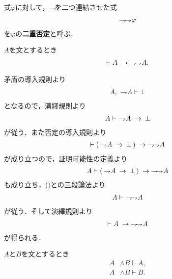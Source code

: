	式$\varphi$に対して，$\rightharpoondown\hspace{-0.25em}$を二つ連結させた式
	\begin{align}
		\rightharpoondown\hspace{-0.25em} \rightharpoondown\hspace{-0.25em} \varphi
	\end{align}
	を$\varphi$の{\bf 二重否定}と呼ぶ．
	
	\begin{screen}
		\begin{logicalthm}[二重否定の導入]
		\label{logicalthm:introduction_of_double_negation}
			$A$を文とするとき
			\begin{align}
				\vdash A \hspace{0.25em}\rightarrow\hspace{0.25em} \rightharpoondown\hspace{-0.25em} \rightharpoondown\hspace{-0.25em} A.
			\end{align}
		\end{logicalthm}
	\end{screen}
	
	\begin{prf}
		矛盾の導入規則より
		\begin{align}
			A,\ \rightharpoondown\hspace{-0.25em} A \vdash \bot
		\end{align}
		となるので，演繹規則より
		\begin{align}
			A \vdash\ \negation A \rarrow \bot
			\label{fom:introduction_of_double_negation}
		\end{align}
		が従う．また否定の導入規則より
		\begin{align}
			\vdash (\, \rightharpoondown\hspace{-0.25em} A \hspace{0.25em}\rightarrow\hspace{0.25em} \bot\, ) \hspace{0.25em}\rightarrow\hspace{0.25em} \rightharpoondown\hspace{-0.25em} \rightharpoondown\hspace{-0.25em} A
		\end{align}
		が成り立つので，証明可能性の定義より
		\begin{align}
			A \vdash (\, \rightharpoondown\hspace{-0.25em} A \hspace{0.25em}\rightarrow\hspace{0.25em} \bot\, ) \hspace{0.25em}\rightarrow\hspace{0.25em} \rightharpoondown\hspace{-0.25em} \rightharpoondown\hspace{-0.25em} A
		\end{align}
		も成り立ち，()との三段論法より
		\begin{align}
			A \vdash\ \rightharpoondown\hspace{-0.25em} \rightharpoondown\hspace{-0.25em} A
		\end{align}
		が従う．そして演繹規則より
		\begin{align}
			\vdash A \hspace{0.25em}\rightarrow\hspace{0.25em} \rightharpoondown\hspace{-0.25em} \rightharpoondown\hspace{-0.25em} A
		\end{align}
		が得られる．
		\QED
	\end{prf}
	
	\begin{screen}
		\begin{logicalaxm}[論理積の除去]
		\label{logicalaxm:elimination_of_conjunction}
			$A$と$B$を文とするとき
			\begin{align}
				A &\wedge B \vdash A, \\
				A &\wedge B \vdash B.
			\end{align}
		\end{logicalaxm}
	\end{screen}
	
